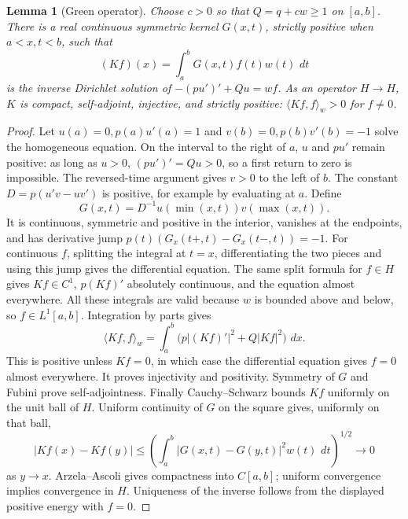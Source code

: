 \documentclass[11pt,oneside]{book}
\newtheorem{lemma}[theorem]{Lemma}
\theoremstyle{definition}
\theoremstyle{remark}\newtheorem{remark}[theorem]{Remark}
\newcommand{\dd}{\,d}\newcommand{\id}{\operatorname{id}}
\begin{document}
\begin{lemma}[Green operator]\label{d13:10:green}
Choose \(c>0\) so that \(Q=q+cw\ge1\) on \([a,b]\).
There is a real continuous symmetric kernel \(G(x,t)\), strictly positive
when \(a<x,t<b\), such that
\[
 (Kf)(x)=\int_a^bG(x,t)f(t)w(t)\,\dd t
\]
is the inverse Dirichlet solution of
\(-(pu')'+Qu=wf\). As an operator \(H\to H\), \(K\) is compact,
self-adjoint, injective, and strictly positive:
\(\langle Kf,f\rangle_w>0\) for \(f\ne0\).
\end{lemma}
\begin{proof}
Let \(u(a)=0,p(a)u'(a)=1\) and \(v(b)=0,p(b)v'(b)=-1\) solve the
homogeneous equation. On the interval to the right of \(a\), \(u\) and
\(pu'\) remain positive: as long as \(u>0\), \((pu')'=Qu>0\),
so a first return to zero is impossible. The reversed-time argument gives
\(v>0\) to the left of \(b\). The constant
\(D=p(u'v-uv')\) is positive, for example by evaluating at \(a\).
Define
\[
 G(x,t)=D^{-1}u(\min(x,t))v(\max(x,t)).
\]
It is continuous, symmetric and positive in the interior, vanishes at
the endpoints, and has derivative jump
\(p(t)(G_x(t+,t)-G_x(t-,t))=-1\).
For continuous \(f\), splitting the integral at \(t=x\), differentiating
the two pieces and using this jump gives the differential equation.
The same split formula for \(f\in H\) gives \(Kf\in C^1\),
\(p(Kf)'\) absolutely continuous, and the equation almost everywhere.
All these integrals are valid because \(w\) is bounded above and below,
so \(f\in L^1[a,b]\). Integration by parts gives
\[
 \langle Kf,f\rangle_w
 =\int_a^b\big(p|(Kf)'|^2+Q|Kf|^2\big)\,\dd x .
\]
This is positive unless \(Kf=0\), in which case the differential equation
gives \(f=0\) almost everywhere. It proves injectivity and positivity.
Symmetry of \(G\) and Fubini prove self-adjointness.
Finally Cauchy--Schwarz bounds \(Kf\) uniformly on the unit ball of \(H\).
Uniform continuity of \(G\) on the square gives, uniformly on that ball,
\[
 |Kf(x)-Kf(y)|
 \le\left(\int_a^b|G(x,t)-G(y,t)|^2w(t)\,\dd t\right)^{1/2}\longrightarrow0
\]
as \(y\to x\). Arzela--Ascoli gives compactness into \(C[a,b]\);
uniform convergence implies convergence in \(H\). Uniqueness of the
inverse follows from the displayed positive energy with \(f=0\).
\end{proof}
\end{document}
